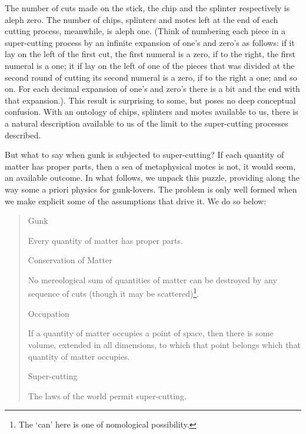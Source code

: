 \documentclass[
  10pt,
  letterpaper,
  DIV=11,
  numbers=noendperiod,
  twoside]{scrartcl}
\providecommand{\tightlist}{%
  \setlength{\itemsep}{0pt}\setlength{\parskip}{0pt}}\usepackage{longtable,booktabs,array}
\begin{document}
The number of cuts made on the stick, the chip and the splinter
respectively is aleph zero. The number of chips, splinters and motes
left at the end of each cutting process, meanwhile, is aleph one. (Think
of numbering each piece in a super-cutting process by an infinite
expansion of one's and zero's as follows: if it lay on the left of the
first cut, the first numeral is a zero, if to the right, the first
numeral is a one; it if lay on the left of one of the pieces that was
divided at the second round of cutting its second numeral is a zero, if
to the right a one; and so on. For each decimal expansion of one's and
zero's there is a bit and the end with that expansion.). This result is
surprising to some, but poses no deep conceptual confusion. With an
ontology of chips, splinters and motes available to us, there is a
natural description available to us of the limit to the super-cutting
processes described.

But what to say when gunk is subjected to super-cutting? If each
quantity of matter has proper parts, then a sea of metaphysical motes is
not, it would seem, an available outcome. In what follows, we unpack
this puzzle, providing along the way some a priori physics for
gunk-lovers. The problem is only well formed when we make explicit some
of the assumptions that drive it. We do so below:

\begin{quote}
\begin{description}
\tightlist
\item[(1)]
Gunk

Every quantity of matter has proper parts.
\item[(2)]
Conservation of Matter

No mereological sum of quantities of matter can be destroyed by any
sequence of cuts (though it may be scattered)\footnote{The `can' here is
  one of nomological possibility.}.
\item[(3)]
Occupation

If a quantity of matter occupies a point of space, then there is some
volume, extended in all dimensions, to which that point belongs which
that quantity of matter occupies.
\item[(4)]
Super-cutting

The laws of the world permit super-cutting.
\end{description}
\end{quote}
\end{document}
